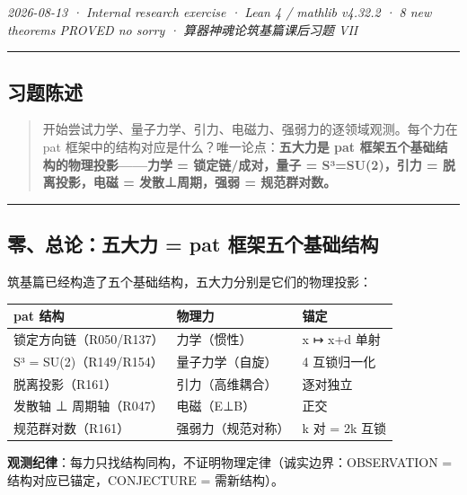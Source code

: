 \documentclass[
]{article}
\newcounter{none} %
\begin{document}
\emph{2026-08-13 · Internal research exercise · Lean 4 / mathlib v4.32.2
· 8 new theorems PROVED no sorry · 算器神魂论筑基篇课后习题 VII }

\begin{center}\rule{0.5\linewidth}{0.5pt}\end{center}

\subsection{习题陈述}\label{ux4e60ux9898ux9648ux8ff0}

\begin{quote}
开始尝试力学、量子力学、引力、电磁力、强弱力的逐领域观测。每个力在 pat
框架中的结构对应是什么？唯一论点：\textbf{五大力是 pat
框架五个基础结构的物理投影------力学 = 锁定链/成对，量子 =
S³=SU(2)，引力 = 脱离投影，电磁 = 发散⊥周期，强弱 = 规范群对数。}
\end{quote}

\begin{center}\rule{0.5\linewidth}{0.5pt}\end{center}

\subsection{零、总论：五大力 = pat
框架五个基础结构}\label{ux96f6ux603bux8bbaux4e94ux5927ux529b-pat-ux6846ux67b6ux4e94ux4e2aux57faux7840ux7ed3ux6784}

筑基篇已经构造了五个基础结构，五大力分别是它们的物理投影：

{\def\LTcaptype{none} %
\begin{longtable}[]{@{}lll@{}}
\toprule\noalign{}
pat 结构 & 物理力 & 锚定 \\
\midrule\noalign{}
\endhead
\bottomrule\noalign{}
\endlastfoot
锁定方向链（R050/R137） & 力学（惯性） & x ↦ x+d 单射 \\
S³ = SU(2)（R149/R154） & 量子力学（自旋） & 4 互锁归一化 \\
脱离投影（R161） & 引力（高维耦合） & 逐对独立 \\
发散轴 ⊥ 周期轴（R047） & 电磁（E⊥B） & 正交 \\
规范群对数（R161） & 强弱力（规范对称） & k 对 = 2k 互锁 \\
\end{longtable}
}

\textbf{观测纪律}：每力只找结构同构，不证明物理定律（诚实边界：OBSERVATION
= 结构对应已锚定，CONJECTURE = 需新结构）。
\end{document}
